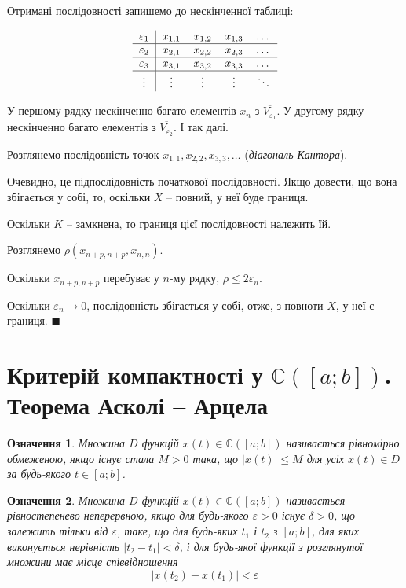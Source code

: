 \documentclass[14pt,twoside]{extreport}
\theoremstyle{mystyle}
\newtheorem{dfn}{Означення}
\renewenvironment{proof}{{\bfseries Доведення.}}{$\blacksquare$}
\numberwithin{equation}{chapter}
\newcommand{\cab}{\mathbb{C}([a; b])}
\begin{document}
\begin{proof}
	Отримані послідовності запишемо до нескінченної таблиці:
	
	\[\begin{tabular}{c|cccc}
	$\varepsilon_1$ & $x_{1, 1}$ & $x_{1, 2}$ & $x_{1, 3}$ & \ldots \\
	\hline
	$\varepsilon_2$ & $x_{2, 1}$ & $x_{2, 2}$ & $x_{2, 3}$ & \ldots \\
	\hline
	$\varepsilon_3$ & $x_{3, 1}$ & $x_{3, 2}$ & $x_{3, 3}$ & \ldots \\
	\hline
	$\vdots$ & $\vdots$ & $\vdots$ & $\vdots$ & $\ddots$ \\
	\end{tabular}
	\]
	
	У першому рядку нескінченно багато елементів $x_n$ з $\overline{V_{\varepsilon_1}}$. У другому рядку нескінченно багато елементів з $\overline{V_{\varepsilon_2}}$. І так далі.
	
	Розглянемо послідовність точок $x_{1, 1}, x_{2, 2}, x_{3, 3}, \ldots$ (\emph{діагональ Кантора}).
	
	Очевидно, це підпослідовність початкової послідовності. Якщо довести, що вона збігається у собі, то, оскільки $X$ -- повний, у неї буде границя.
	
	Оскільки $K$ -- замкнена, то границя цієї послідовності належить їй.
	
	Розглянемо $\rho(x_{n + p, n + p}, x_{n, n})$.
	
	Оскільки $x_{n + p, n + p}$ перебуває у $n$-му рядку, $\rho \leqslant 2\varepsilon_n$.
	
	Оскільки $\varepsilon_n \to 0$, послідовність збігається у собі, отже, з повноти $X$, у неї є границя.
\end{proof}


\section{Критерій компактності у \texorpdfstring{$\cab$}{C([a; b])}. Теорема Асколі -- Арцела}

\begin{dfn}
	Множина $D$ функцій $x(t) \in \cab$ називається рівномірно обмеженою, якщо існує стала $M>0$ така, що $|x(t)| \leqslant M$ для усіх $x(t) \in D$ за будь-якого $t \in [a; b]$.
\end{dfn}
\begin{dfn}
	Множина $D$ функцій $x(t) \in \cab$ називається рівностепенево неперервною, якщо для будь-якого $\varepsilon > 0$ існує $\delta > 0$, що залежить тільки від $\varepsilon$, таке, що для будь-яких $t_1$ і $t_2$ з $[a; b]$, для яких виконується нерівність $|t_2 - t_1| < \delta$, і для будь-якої функції з розглянутої множини має місце співвідношення
	\[|x(t_2) - x(t_1)|<\varepsilon\]
\end{dfn}
\end{document}
